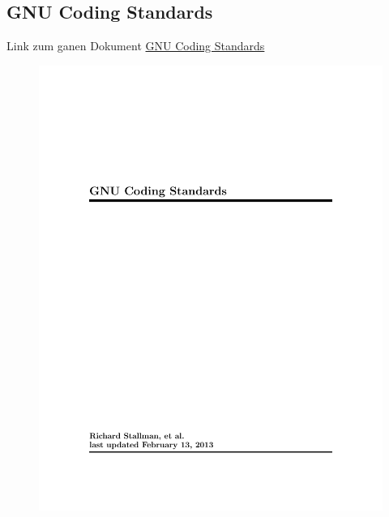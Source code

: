 \documentclass[a4paper,
               10pt,
               fleqn]{article}
\begin{document}
\begin{appendix}
    \section{GNU Coding Standards}
    Link zum ganen Dokument
    \href{http://www.gnu.org/prep/standards/}{GNU Coding Standards}
    \begin{figure}[h!]
    \includegraphics[page=5, width=1\textwidth]{gnustandard.pdf}
    \end{figure}

\end{appendix}
\end{document}
